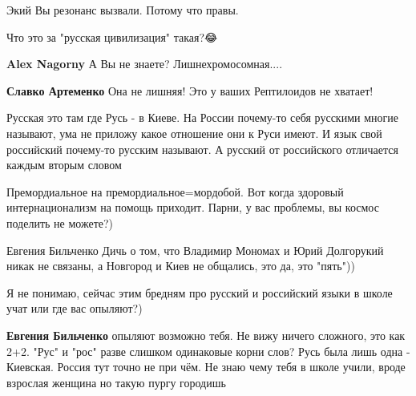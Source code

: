 \begin{itemize}

Экий Вы резонанс вызвали. Потому что правы.




Что это за "русская цивилизация" такая?😂

\begin{itemize}
\textbf{Alex Nagorny} А Вы не знаете? Лишнехромосомная....


\textbf{Славко Артеменко} Она не лишняя! Это у ваших Рептилоидов не хватает!


Русская это там где Русь - в Киеве. На России почему-то себя русскими многие называют, ума не приложу какое отношение они к Руси имеют. И язык свой российский почему-то русским называют. А русский от российского отличается каждым вторым словом


Премордиальное на премордиальное=мордобой. Вот когда здоровый интернационализм на помощь приходит. Парни, у вас проблемы, вы космос поделить не можете?)

Евгения Бильченко
Дичь о том, что Владимир Мономах и Юрий Долгорукий никак не связаны, а Новгород и Киев не общались, это да, это "пять"))


Я не понимаю, сейчас этим бредням про русский и российский языки в школе учат или где вас опыляют?)


\textbf{Евгения Бильченко} опыляют возможно тебя. Не вижу ничего сложного, это как 2+2. "Рус" и "рос" разве слишком одинаковые корни слов?
Русь была лишь одна - Киевская. Россия тут точно не при чём. Не знаю чему тебя в школе учили, вроде взрослая женщина но такую пургу городишь🤣


\end{itemize}
\end{itemize}
